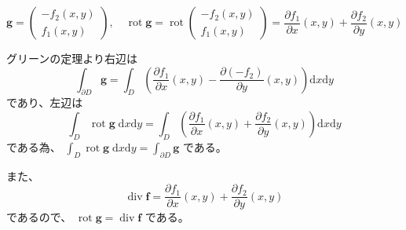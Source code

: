 \documentclass[12pt,b5paper]{ltjsarticle}
\newcommand{\Rot}{\mathop{\mathrm{rot}}\nolimits}
\newcommand{\Div}{\mathop{\mathrm{div}}\nolimits}
\begin{document}
\dotfill

\begin{equation}
 \bm{g}=\begin{pmatrix}-f_2(x,y)\\f_1(x,y)\end{pmatrix}
 ,\quad
  \Rot\bm{g}=\Rot\begin{pmatrix}-f_2(x,y)\\f_1(x,y)\end{pmatrix}
  =\frac{\partial f_1}{\partial x}(x,y) + \frac{\partial f_2}{\partial y}(x,y)
\end{equation}

グリーンの定理より右辺は
\begin{equation}
 \int_{\partial D}\bm{g}
  = \int_{D}\left(\frac{\partial f_1}{\partial x}(x,y) - \frac{\partial (-f_2)}{\partial y}(x,y)\right)\mathrm{d}x\mathrm{d}y
\end{equation}
であり、左辺は
\begin{equation}
 \int_{D}\Rot\bm{g}\;\mathrm{d}x\mathrm{d}y
  = \int_{D}\left(\frac{\partial f_1}{\partial x}(x,y) + \frac{\partial f_2}{\partial y}(x,y)\right)\mathrm{d}x\mathrm{d}y
\end{equation}
である為、
 $\int_{D}\Rot\bm{g}\;\mathrm{d}x\mathrm{d}y=\int_{\partial D}\bm{g}$
である。

また、
\begin{equation}
 \Div\bm{f}=\frac{\partial f_1}{\partial x}(x,y) + \frac{\partial f_2}{\partial y}(x,y)
\end{equation}
であるので、
$\Rot\bm{g}=\Div\bm{f}$
である。


\hrulefill
\end{document}
